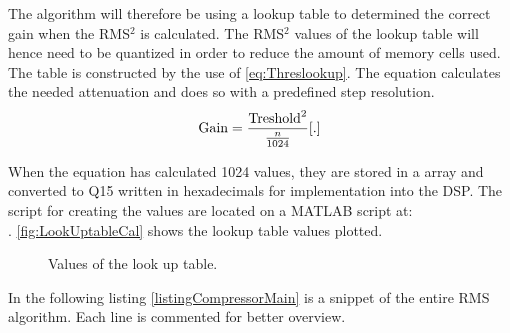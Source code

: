 The algorithm will therefore be using a lookup table to determined the correct gain when the RMS$^2$ is calculated. The RMS$^2$ values of the lookup table will hence need to be quantized in order to reduce the amount of memory cells used. The table is constructed by the use of \autoref{eq:Threslookup}. The equation calculates the needed attenuation and does so with a predefined step resolution. 
\vspace{-2mm}
\begin{equation}\label{eq:Threslookup}
\text{Gain}=\frac{\text{Treshold}^2}{\frac{n}{1024}}\enhed{.}
\end{equation}
\begin{where}
\end{where}

\vspace{2mm}
When the equation has calculated 1024 values, they are stored in a array and converted to Q15 written in hexadecimals for implementation into the DSP.
The script for creating the values are located on a MATLAB script at: \\
. \autoref{fig:LookUptableCal} shows the lookup table values plotted.

\begin{figure}[H]
	\centering
	
	\caption{Values of the look up table.}
	\label{fig:LookUptableCal}
\end{figure}


In the following listing \ref{listingCompressorMain} is a snippet of the entire RMS algorithm. Each line is commented for better overview.

